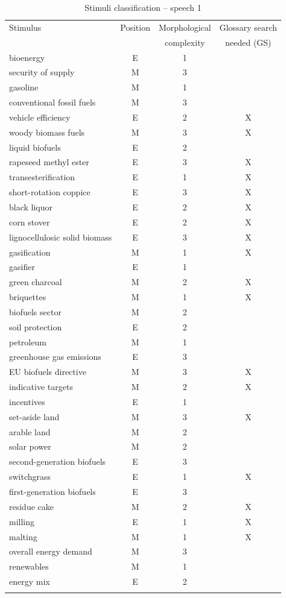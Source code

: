 \documentclass[output=paper]{langsci/langscibook}
\begin{document}
\begin{table}\footnotesize
	\caption{Stimuli classification -- speech 1\label{tab:prandi:1}}
\begin{tabularx}{\linewidth}{Xccc}
\lsptoprule
{Stimulus} & {Position} & {Morphological} & {Glossary search}\\
		   &            &  complexity      & needed (GS)\\\midrule
bioenergy & E & 1 & \\
security of supply & M & 3 & \\
gasoline & M & 1 & \\
conventional fossil fuels & M & 3 & \\
vehicle efficiency & E & 2 & X\\
woody biomass fuels & M & 3 & X\\
liquid biofuels & E & 2 & \\
rapeseed methyl ester & E & 3 & X\\
transesterification & E & 1 & X\\
short-rotation coppice & E & 3 & X\\
black liquor & E & 2 & X\\
corn stover & E & 2 & X\\
lignocellulosic solid biomass & E & 3 & X\\
gasification & M & 1 & X\\
gasifier & E & 1 & \\
green charcoal & M & 2 & X\\
briquettes & M & 1 & X\\
biofuels sector & M & 2 & \\
soil protection & E & 2 & \\
petroleum & M & 1 & \\
greenhouse gas emissions & E & 3 & \\
EU biofuels directive & M & 3 & X\\
indicative targets & M & 2 & X\\
incentives & E & 1 & \\
set-aside land & M & 3 & X\\
arable land & M & 2 & \\
solar power & M & 2 & \\
second-generation biofuels & E & 3 & \\
switchgrass & E & 1 & X\\
first-generation biofuels & E & 3 & \\
residue cake & M & 2 & X\\
milling & E & 1 & X\\
malting & M & 1 & X\\
overall energy demand & M & 3 & \\
renewables & M & 1 & \\
energy mix & E & 2 & \\
\lspbottomrule
\end{tabularx}
\end{table}
\end{document}

